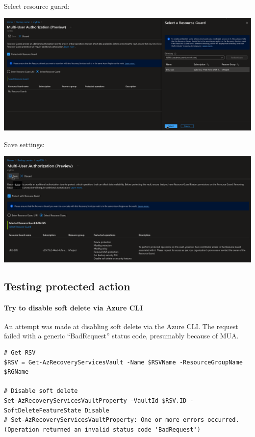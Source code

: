 Select resource guard:
\begin{center}
\includegraphics[width=.9\linewidth]{figures/mua/select_resource_guard.png}
\end{center}

Save settings:
\begin{center}
\includegraphics[width=.9\linewidth]{figures/mua/save_mua_settings.png}
\end{center}

\subsection{Testing protected action}
\paragraph{Try to disable soft delete via Azure CLI}
\label{sec:org532e6eb}
An attempt was made at disabling soft delete via the Azure CLI.
The request failed with a generic ``BadRequest'' status code,
presumably because of MUA.

\begin{verbatim}
# Get RSV
$RSV = Get-AzRecoveryServicesVault -Name $RSVName -ResourceGroupName $RGName

# Disable soft delete
Set-AzRecoveryServicesVaultProperty -VaultId $RSV.ID -SoftDeleteFeatureState Disable
# Set-AzRecoveryServicesVaultProperty: One or more errors occurred. (Operation returned an invalid status code 'BadRequest')
\end{verbatim}

